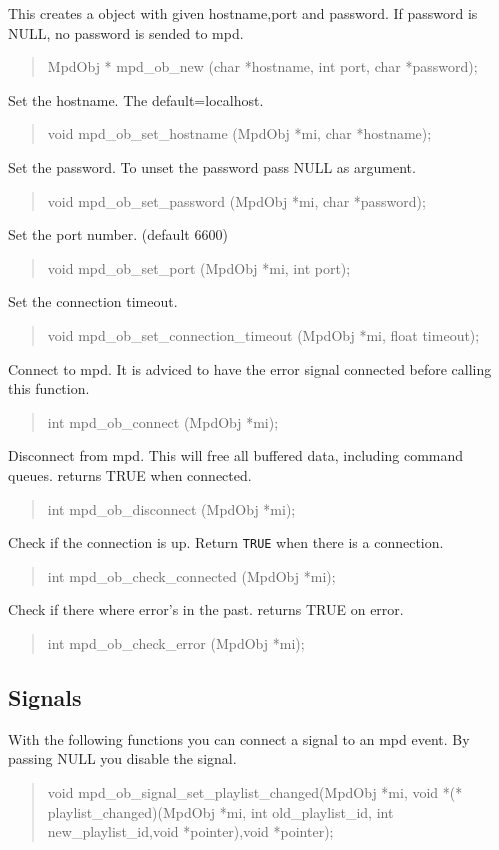 \documentclass[a4paper,11pt]{article}
\begin{document}
This creates a object with given hostname,port and password. If password is NULL, no password is sended to mpd.
\begin{quote}
MpdObj * mpd\_ob\_new (char *hostname, int port, char *password); 
\end{quote}
Set the hostname. The default=localhost.
\begin{quote}
void mpd\_ob\_set\_hostname (MpdObj *mi, char *hostname); 
\end{quote}
Set the password. To unset the password pass NULL as argument.
\begin{quote}
void mpd\_ob\_set\_password (MpdObj *mi, char *password); 
\end{quote}
Set the port number. (default 6600)
\begin{quote}
void mpd\_ob\_set\_port (MpdObj *mi, int port); 
\end{quote}
Set the connection timeout.
\begin{quote}
void mpd\_ob\_set\_connection\_timeout (MpdObj *mi, float timeout);
\end{quote}
Connect to mpd. It is adviced to have the error signal connected before calling this function.
\begin{quote}
int mpd\_ob\_connect (MpdObj *mi); 
\end{quote}
Disconnect from mpd. This will free all buffered data, including command queues.
returns TRUE when connected.
\begin{quote}
int mpd\_ob\_disconnect (MpdObj *mi);
\end{quote}
Check if the connection is up.
Return \verb|TRUE| when there is a connection.
\begin{quote}
int mpd\_ob\_check\_connected (MpdObj *mi); 
\end{quote}
Check if there where error's in the past.
returns TRUE on error.
\begin{quote}
int mpd\_ob\_check\_error (MpdObj *mi);
\end{quote}





\subsection{Signals}

With the following functions you can connect a signal to an mpd event. By passing NULL you disable the signal.\\

\begin{quote}
void mpd\_ob\_signal\_set\_playlist\_changed(MpdObj *mi, void *(* playlist\_changed)(MpdObj *mi, int old\_playlist\_id, int new\_playlist\_id,void *pointer),void *pointer);
\end{quote}
\end{document}
